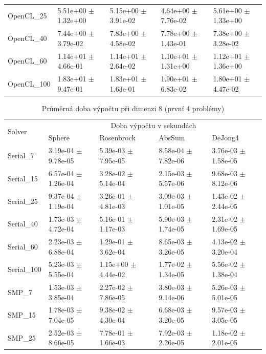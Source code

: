 \documentclass[12pt, a4paper]{report}
\begin{document}
\begin{table}
\begin{tabular}{l|l|l|l|l}
		OpenCL\_25 & 5.51e+00 $\pm$ 1.32e+00 & 5.15e+00 $\pm$ 3.91e-02 & 4.64e+00 $\pm$ 7.76e-02 & 5.61e+00 $\pm$ 1.33e+00 \\
		OpenCL\_40 & 7.44e+00 $\pm$ 3.79e-02 & 7.83e+00 $\pm$ 4.58e-02 & 7.78e+00 $\pm$ 1.43e-01 & 7.38e+00 $\pm$ 3.28e-02 \\
		OpenCL\_60 & 1.14e+01 $\pm$ 4.66e-01 & 1.14e+01 $\pm$ 2.64e-02 & 1.10e+01 $\pm$ 1.31e+00 & 1.12e+01 $\pm$ 1.36e+00 \\
		OpenCL\_100 & 1.83e+01 $\pm$ 9.47e-01 & 1.83e+01 $\pm$ 1.63e-01 & 1.90e+01 $\pm$ 6.83e-02 & 1.80e+01 $\pm$ 4.47e-02 \\
	\end{tabular}
\end{table}

\begin{table}
	\scriptsize
	\caption{Průměrná doba výpočtu při dimenzi 8 (první 4 problémy)}
	\centering
	\label{tbl:time8}
	\begin{tabular}{l|l|l|l|l}
		\multirow{2}{*}{Solver} & \multicolumn{4}{c}{Doba výpočtu v sekundách} \\
		& Sphere & Rosenbrock & AbsSum & DeJong4 \\
		\hline
		\hline
		Serial\_7 & 3.19e-04 $\pm$ 9.78e-05 & 5.39e-03 $\pm$ 7.95e-05 & 8.58e-04 $\pm$ 7.82e-06 & 3.76e-03 $\pm$ 1.58e-05 \\
		Serial\_15 & 6.57e-04 $\pm$ 1.26e-04 & 3.28e-02 $\pm$ 5.14e-04 & 2.15e-03 $\pm$ 5.57e-06 & 9.68e-03 $\pm$ 8.12e-06 \\
		Serial\_25 & 9.37e-04 $\pm$ 1.19e-04 & 3.26e-01 $\pm$ 4.81e-03 & 3.09e-03 $\pm$ 1.01e-05 & 1.43e-02 $\pm$ 2.44e-05 \\
		Serial\_40 & 1.73e-03 $\pm$ 4.72e-04 & 5.16e-01 $\pm$ 1.17e-03 & 5.90e-03 $\pm$ 1.74e-05 & 2.31e-02 $\pm$ 1.69e-05 \\
		Serial\_60 & 2.23e-03 $\pm$ 6.88e-04 & 1.29e-01 $\pm$ 3.62e-04 & 8.65e-03 $\pm$ 3.26e-05 & 4.13e-02 $\pm$ 3.20e-04 \\
		Serial\_100 & 5.23e-03 $\pm$ 5.55e-04 & 1.15e+00 $\pm$ 4.44e-02 & 1.77e-02 $\pm$ 1.34e-05 & 5.56e-02 $\pm$ 1.38e-04 \\
		\hline
		SMP\_7 & 1.53e-03 $\pm$ 3.85e-04 & 2.27e-02 $\pm$ 7.86e-05 & 3.80e-03 $\pm$ 9.14e-06 & 5.26e-03 $\pm$ 5.01e-05 \\
		SMP\_15 & 1.78e-03 $\pm$ 7.04e-05 & 9.38e-02 $\pm$ 4.30e-04 & 6.68e-03 $\pm$ 3.20e-05 & 9.57e-03 $\pm$ 3.05e-05 \\
		SMP\_25 & 2.52e-03 $\pm$ 8.66e-05 & 7.78e-01 $\pm$ 1.66e-03 & 7.92e-03 $\pm$ 2.26e-05 & 1.18e-02 $\pm$ 2.01e-05 \\

\end{tabular}
\end{table}
\end{document}
